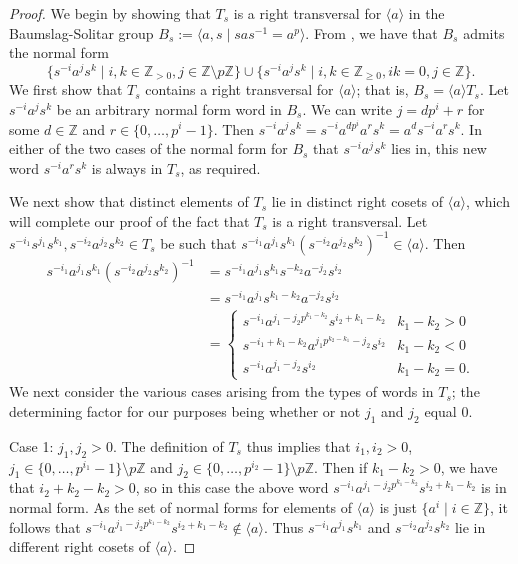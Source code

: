 \documentclass[11pt]{amsart}
\theoremstyle{definition}
\numberwithin{theorem}{section}
\newcommand{\Z}{\mathbb{Z}}
\begin{document}
	\begin{proof}
		We begin by showing that \(T_s\) is a right transversal for \(\langle
		a \rangle\) in the Baumslag-Solitar group \(B_s := \langle a , s \mid sas^{-1}
		= a^p\rangle\). From \cite[Section~2]{BurilloElder}, we have that \(B_s\) admits
		the normal form
		\[
				\{ s^{-i} a^j s^k \mid i, k \in \Z_{> 0}, j \in \Z \setminus p\Z \} 
				\cup \{s^{-i} a^j s^k \mid i, k \in \Z_{\geq 0}, ik = 0, j \in \Z\}.
		\]
		We first show that \(T_s\) contains a right transversal for \(\langle a
		\rangle\); that is, \(B_s = \langle a \rangle T_s\). Let \(s^{-i} a^j
		s^k \) be an arbitrary normal form word in \(B_s\). We can write \(j =
		d p^i + r\) for some \(d \in \Z\) and \(r \in \{0, \ldots, p^i - 1\}\).
		Then \(s^{-i} a^j s^k = s^{-i} a^{d p^i} a^r s^k = a^d s^{-i} a^{r}
		s^k\). In either of the two cases of the normal form for \(B_s\)
		that \(s^{-i} a^j s^k\) lies in, this new word \(s^{-i} a^r s^k\) is
		always in \(T_s\), as required.

		We next show that distinct elements of \(T_s\) lie in distinct right
		cosets of \(\langle a \rangle\), which will complete our proof of the
		fact that \(T_s\) is a right transversal. Let \(s^{-i_1} s^{j_1}
		s^{k_1}, s^{-i_2} a^{j_2} s^{k_2} \in T_s\) be such that \(s^{-i_1}
		a^{j_1} s^{k_1} (s^{-i_2} a^{j_2} s^{k_2})^{-1} \in \langle a
		\rangle\). Then
		\begin{align*}
				s^{-i_1} a^{j_1} s^{k_1} (s^{-i_2} a^{j_2} s^{k_2})^{-1}
				& = s^{-i_1} a^{j_1} s^{k_1} s^{-k_2} a^{-j_2} s^{i_2} \\
				& = s^{-i_1} a^{j_1} s^{k_1 - k_2} a^{-j_2} s^{i_2} \\
				& = \begin{cases}
						s^{-i_1} a^{j_1 - j_2 p^{k_1 - k_2}} s^{i_2 + k_1 - k_2}
						& k_1 - k_2 > 0 \\
						s^{-i_1 + k_1 - k_2} a^{j_1 p^{k_2 - k_1} - j_2}
						s^{i_2} & k_1 - k_2 < 0 \\
						s^{-i_1} a^{j_1 - j_2} s^{i_2} & k_1 - k_2 = 0.
				\end{cases}
		\end{align*}
		We next consider the various cases arising from the types of
		words in \(T_s\); the determining factor for our purposes
		being whether or not \(j_1\) and \(j_2\) equal \(0\).

		Case 1: \(j_1, j_2 > 0\). The definition of \(T_s\) thus implies
		that \(i_1, i_2 > 0\), \(j_1\in \{0, \ldots, p^{i_1} - 1\}
		\setminus p\Z\) and \(j_2 \in \{0, \ldots, p^{i_2} - 1\} \setminus
		p\Z\). Then if \(k_1 - k_2 > 0\), we have that \(i_2 + k_2 - k_2 > 0\),
		so in this case the above word \(s^{-i_1} a^{j_1 - j_2 p^{k_1 - k_2}}
		s^{i_2 + k_1 - k_2}\) is in normal form. As the set of normal forms for
		elements of \(\langle a \rangle\) is just \(\{a^i \mid i \in \Z\}\),
		it follows that \(s^{-i_1}a^{j_1 - j_2 p^{k_1 - k_2}}
		s^{i_2 + k_1 - k_2} \notin \langle a \rangle\). Thus \(s^{-i_1} a^{j_1}
		s^{k_1}\) and \(s^{-i_2} a^{j_2} s^{k_2}\) lie in different right
		cosets of \(\langle a \rangle\).


\end{proof}
\end{document}
